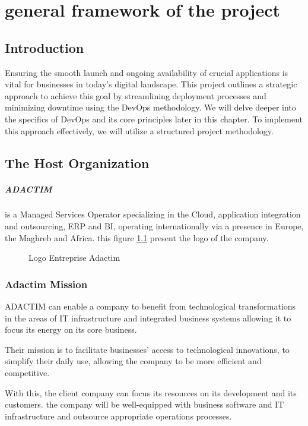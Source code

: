 \chapter{general framework of the project}
\section*{Introduction}
Ensuring the smooth launch and ongoing availability of crucial applications is vital for businesses in today's digital landscape. This project outlines a strategic approach to achieve this goal by streamlining deployment processes and minimizing downtime using the DevOps methodology. We will delve deeper into the specifics of DevOps and its core principles later in this chapter. To implement this approach effectively, we will utilize a structured project methodology.
\section{The Host Organization}
\paragraph[short]{ADACTIM}
is a Managed Services Operator specializing in the Cloud, application integration and outsourcing, ERP and BI, operating internationally via a presence in Europe, the Maghreb and Africa.
\newline
this figure \ref{fig:logo_Adactim} present the logo of the company.

\begin{figure}[htpb]
    \centering
    \caption{Logo Entreprise Adactim}
    \label{fig:logo_Adactim}
\end{figure}

\subsection*{Adactim  Mission}
ADACTIM can enable a company to benefit from technological transformations in the areas of IT infrastructure and integrated business systems allowing it to focus its energy on its core business.
\par
Their mission is to facilitate businesses' access to technological innovations, to simplify their daily use, allowing the company to be more efficient and competitive.
\par
With this, the client company can focus its resources on its development and its customers. the company will be well-equipped with business software and IT infrastructure and outsource appropriate operations processes.
